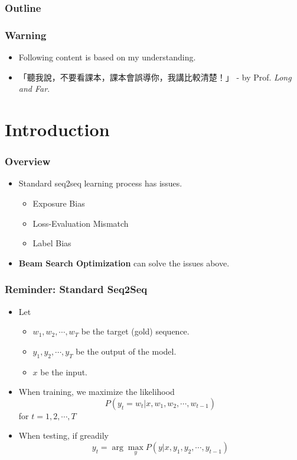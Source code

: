 \begin{frame}
\frametitle{Outline}
\tableofcontents
\end{frame}

\begin{frame}
  \frametitle{Warning}
  \begin{itemize}
  \item Following content is based on my understanding.
  \item {\zhfont 「聽我說，不要看課本，課本會誤導你，我講比較清楚！」} - by Prof. \textit{Long and Far}.
  \end{itemize}
\end{frame}

\section{Introduction}


\begin{frame}
  \frametitle{Overview}
  \begin{itemize}
  \item Standard seq2seq learning process has issues.
    \begin{itemize}
    \item Exposure Bias
    \item Loss-Evaluation Mismatch
    \item Label Bias
    \end{itemize}
  \item \textbf{Beam Search Optimization} can solve the issues above.
  \end{itemize}
\end{frame}

\begin{frame}
  \frametitle{Reminder: Standard Seq2Seq}
  \begin{itemize}
  \item Let
    \begin{itemize}
    \item $w_1, w_2, \cdots, w_T$ be the target (gold) sequence.
    \item $y_1, y_2, \cdots, y_T$ be the output of the model.
    \item $x$ be the input.
    \end{itemize}
  \item When training, we maximize the likelihood
    $$P(y_t = w_t | x, w_1, w_2, \cdots, w_{t-1})$$
    for $t = 1, 2, \cdots, T$
  \item When testing, if greadily
    $$y_t = \arg \max_y P(y | x, y_1, y_2, \cdots, y_{t-1})$$
\end{itemize}
\end{frame}


